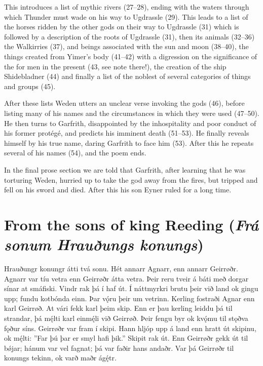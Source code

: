 This introduces a list of mythic rivers (27–28), ending with the waters through which Thunder must wade on his way to Ugdrassle (29). This leads to a list of the horses ridden by the other gods on their way to Ugdrassle (31) which is followed by a description of the roots of Ugdrassle (31), then its animals (32–36) the Walkirries (37), and beings associated with the sun and moon (38–40), the things created from Yimer’s body (41–42) with a digression on the significance of the  for men in the present (43, see note there!), the creation of the ship Shidebladner (44) and finally a list of the noblest of several categories of things and groups (45).

After these lists Weden utters an unclear verse invoking the gods (46), before listing many of his names and the circumstances in which they were used (47–50). He then turns to Garfrith, disappointed by the inhospitality and poor conduct of his former protégé, and predicts his imminent death (51–53). He finally reveals himself by his true name, daring Garfrith to face him (53). After this he repeats several of his names (54), and the poem ends.

In the final prose section we are told that Garfrith, after learning that he was torturing Weden, hurried up to take the god away from the fires, but tripped and fell on his sword and died. After this his son Eyner ruled for a long time.

\sectionline

\section{From the sons of king Reeding (\emph{Frá sonum Hrauðungs konungs})}

\bpg
\bpa[1a]Hrauðungr konungr átti tvá sonu. Hét annarr Agnarr, enn annarr Geirrøðr.
Agnarr var tíu vetra enn Geirrøðr átta vetra. Þeir reru tveir á báti með dorgar sínar at smáfiski.
Vindr rak þá í haf út. Í náttmyrkri brutu þeir við land ok gingu upp; fundu kotbónda einn.
Þar vǫ́ru þeir um vetrinn. Kerling fostraði Agnar enn karl Geirrøð.
At vári fekk karl þeim skip. Enn er þau kerling leiddu þá til strandar, þá mę́lti karl einmę́li við Geirrøð.
Þeir fengu byr ok kvǫ́mu til stǫðva fǫður síns. Geirrøðr var fram í skipi.
Hann hljóp upp á land enn hratt út skipinu, ok mę́lti: ”Far þú þar er smyl hafi þik.”
Skipit rak út. Enn Geirrøðr gekk út til bǿjar; hánum var vel fagnat; þá var faðir hans andaðr.
Var þá Geirrøðr til konungs tekinn, ok varð maðr ágę́tr.\epa

